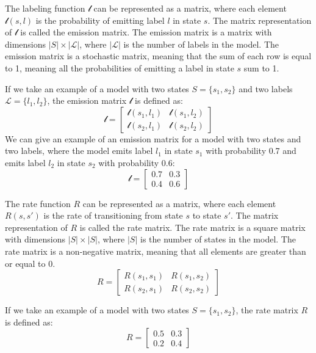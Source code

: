 The labeling function $\mathcal{l}$ can be represented as a matrix, where each element $\mathcal{l}(s, l)$ is the probability of emitting label $l$ in state $s$. The matrix representation of $\mathcal{l}$ is called the emission matrix. The emission matrix is a matrix with dimensions $|S| \times |\mathcal{L}|$, where $|\mathcal{L}|$ is the number of labels in the model. The emission matrix is a stochastic matrix, meaning that the sum of each row is equal to 1, meaning all the probabilities of emitting a label in state $s$ sum to 1. 

If we take an example of a model with two states $S = \{s_1, s_2\}$ and two labels $\mathcal{L} = \{l_1, l_2\}$, the emission matrix $\mathcal{l}$ is defined as:
\begin{equation}
    \mathcal{l} = \begin{bmatrix}
        \mathcal{l}(s_1, l_1) & \mathcal{l}(s_1, l_2) \\
        \mathcal{l}(s_2, l_1) & \mathcal{l}(s_2, l_2)
    \end{bmatrix}
\end{equation}
We can give an example of an emission matrix for a model with two states and two labels, where the model emits label $l_1$ in state $s_1$ with probability 0.7 and emits label $l_2$ in state $s_2$ with probability 0.6:
\begin{equation}
    \mathcal{l} = \begin{bmatrix}
        0.7 & 0.3 \\
        0.4 & 0.6
    \end{bmatrix}
\end{equation}

The rate function $R$ can be represented as a matrix, where each element $R(s, s')$ is the rate of transitioning from state $s$ to state $s'$. The matrix representation of $R$ is called the rate matrix. The rate matrix is a square matrix with dimensions $|S| \times |S|$, where $|S|$ is the number of states in the model. The rate matrix is a non-negative matrix, meaning that all elements are greater than or equal to 0.
\begin{equation}
    R = \begin{bmatrix}
        R(s_1, s_1) & R(s_1, s_2) \\
        R(s_2, s_1) & R(s_2, s_2)
    \end{bmatrix}
\end{equation}

If we take an example of a model with two states $S = \{s_1, s_2\}$, the rate matrix $R$ is defined as:
\begin{equation}
    R = \begin{bmatrix}
        0.5 & 0.3 \\
        0.2 & 0.4
    \end{bmatrix}   
\end{equation}